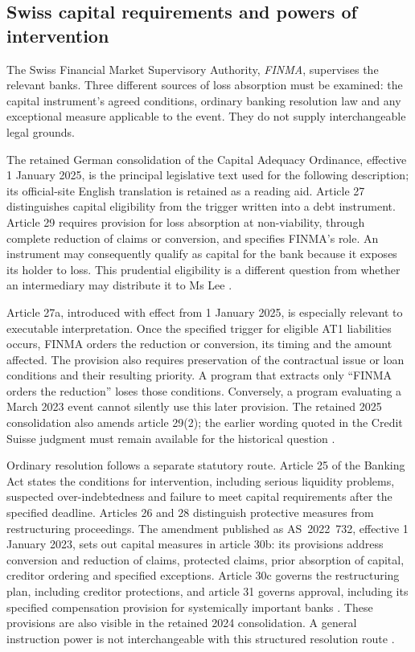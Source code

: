 \documentclass[12pt,a4paper,oneside,openany]{book}
\begin{document}
\subsection{Swiss capital requirements and powers of intervention}

The Swiss Financial Market Supervisory Authority, \emph{FINMA}, supervises the
relevant banks. Three different sources of loss absorption must be examined:
the capital instrument's agreed conditions, ordinary banking resolution law and
any exceptional measure applicable to the event. They do not supply
interchangeable legal grounds.

The retained German consolidation of the Capital Adequacy Ordinance, effective
1 January 2025, is the principal legislative text used for the following
description; its official-site English translation is retained as a reading
aid. Article 27 distinguishes capital eligibility from the trigger written
into a debt instrument. Article 29 requires provision for loss absorption at
non-viability, through complete reduction of claims or conversion, and specifies
FINMA's role. An instrument may consequently qualify as capital for the bank
because it exposes its holder to loss. This prudential eligibility is a different
question from whether an intermediary may distribute it to Ms Lee
\citep[arts.~27--29]{swisscao2025}.

Article 27a, introduced with effect from 1 January 2025, is especially relevant
to executable interpretation. Once the specified trigger for eligible AT1
liabilities occurs, FINMA orders the reduction or conversion, its timing and
the amount affected. The provision also requires preservation of the
contractual issue or loan conditions and their resulting priority. A program
that extracts only ``FINMA orders the reduction'' loses those conditions.
Conversely, a program evaluating a March 2023 event cannot silently use this
later provision. The retained 2025 consolidation also amends article 29(2);
the earlier wording quoted in the Credit Suisse judgment must remain available
for the historical question
\citep[arts.~27a and 29, amendment footnotes]{swisscao2025}.

Ordinary resolution follows a separate statutory route. Article 25 of the
Banking Act states the conditions
for intervention, including serious liquidity problems, suspected
over-indebtedness and failure to meet capital requirements after the specified
deadline. Articles 26 and 28 distinguish protective measures from restructuring
proceedings. The amendment published as AS~2022~732, effective 1 January 2023,
sets out capital measures in article 30b: its provisions address conversion and
reduction of claims, protected claims, prior absorption of capital, creditor
ordering and specified exceptions. Article 30c governs the restructuring plan,
including creditor protections, and article 31 governs approval, including its
specified compensation provision for systemically important banks
\citep[arts.~30b--31 and commencement provision]{swissbankamend2022}. These
provisions are also visible in the retained 2024 consolidation. A general
instruction power is not interchangeable with this structured resolution route
\citep[arts.~25--31]{swissbank2024}.
\end{document}
